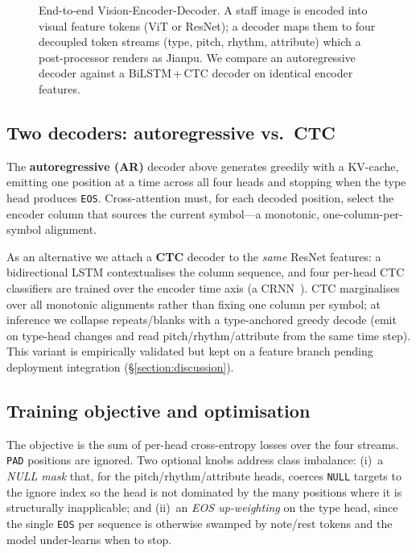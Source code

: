 \begin{figure}[htbp]
    \caption{End-to-end Vision-Encoder-Decoder. A staff image is encoded into
    visual feature tokens (ViT or ResNet); a decoder maps them to four decoupled
    token streams (type, pitch, rhythm, attribute) which a post-processor renders
    as Jianpu. We compare an autoregressive decoder against a BiLSTM\,+\,CTC
    decoder on identical encoder features.}
    \label{fig:architecture}
\end{figure}

\subsection{Two decoders: autoregressive vs.\ CTC}
\label{sec:method:decoders}

The \textbf{autoregressive (AR)} decoder above generates greedily with a KV-cache,
emitting one position at a time across all four heads and stopping when the type
head produces \texttt{EOS}. Cross-attention must, for each decoded position,
select the encoder column that sources the current symbol---a monotonic,
one-column-per-symbol alignment.

As an alternative we attach a \textbf{CTC} decoder to the \emph{same} ResNet
features: a bidirectional LSTM contextualises the column sequence, and four
per-head CTC~\citep{graves2006ctc} classifiers are trained over the encoder time
axis (a CRNN~\citep{shi2015crnn,calvozaragoza2018end}). CTC marginalises over all
monotonic alignments rather than fixing one column per symbol; at inference we
collapse repeats/blanks with a type-anchored greedy decode (emit on type-head
changes and read pitch/rhythm/attribute from the same time step). This variant is
empirically validated but kept on a feature branch pending deployment integration
(\S\ref{section:discussion}).

\subsection{Training objective and optimisation}
\label{sec:method:train}

The objective is the sum of per-head cross-entropy losses over the four streams.
\texttt{PAD} positions are ignored. Two optional knobs address class imbalance:
(i)~a \emph{NULL mask} that, for the pitch/rhythm/attribute heads, coerces
\texttt{NULL} targets to the ignore index so the head is not dominated by the many
positions where it is structurally inapplicable; and (ii)~an \emph{EOS
up-weighting} on the type head, since the single \texttt{EOS} per sequence is
otherwise swamped by note/rest tokens and the model under-learns when to stop.

